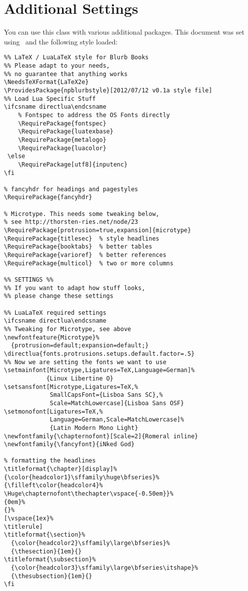 \documentclass[english,10pt,bbook=pocketbig,inner=1cm,outer=2.5cm]{npblurb}
\begin{document}
\chapter{Additional Settings}
You can use this class with various additional packages. This document was set using \LuaLaTeX\ and the following style loaded:
\begin{Verbatim}
%% LaTeX / LuaLaTeX style for Blurb Books
%% Please adapt to your needs, 
%% no guarantee that anything works
\NeedsTeXFormat{LaTeX2e}
\ProvidesPackage{npblurbstyle}[2012/07/12 v0.1a style file]
%% Load Lua Specific Stuff
\ifcsname directlua\endcsname
	% Fontspec to address the OS Fonts directly
	\RequirePackage{fontspec}
	\RequirePackage{luatexbase}
	\RequirePackage{metalogo}
	\RequirePackage{luacolor}
 \else
    \RequirePackage[utf8]{inputenc}
\fi

% fancyhdr for headings and pagestyles
\RequirePackage{fancyhdr}

% Microtype. This needs some tweaking below, 
% see http://thorsten-ries.net/node/23
\RequirePackage[protrusion=true,expansion]{microtype}
\RequirePackage{titlesec}  % style headlines
\RequirePackage{booktabs}  % better tables
\RequirePackage{varioref}  % better references
\RequirePackage{multicol}  % two or more columns

%% SETTINGS %%
%% If you want to adapt how stuff looks, 
%% please change these settings

%% LuaLaTeX required settings
\ifcsname directlua\endcsname
%% Tweaking for Microtype, see above
\newfontfeature{Microtype}%
  {protrusion=default;expansion=default;}
\directlua{fonts.protrusions.setups.default.factor=.5}
%% Now we are setting the fonts we want to use
\setmainfont[Microtype,Ligatures=TeX,Language=German]%
            {Linux Libertine O}
\setsansfont[Microtype,Ligatures=TeX,%
             SmallCapsFont={Lisboa Sans SC},%
             Scale=MatchLowercase]{Lisboa Sans OSF}
\setmonofont[Ligatures=TeX,%
             Language=German,Scale=MatchLowercase]%
             {Latin Modern Mono Light}
\newfontfamily{\chapternofont}[Scale=2]{Romeral inline}
\newfontfamily{\fancyfont}{iNked God}

% formatting the headlines
\titleformat{\chapter}[display]%
{\color{headcolor1}\sffamily\huge\bfseries}%
{\filleft\color{headcolor4}%
\Huge\chapternofont\thechapter\vspace{-0.50em}}%
{0em}%
{}%
[\vspace{1ex}%
\titlerule]
\titleformat{\section}%
  {\color{headcolor2}\sffamily\large\bfseries}%
  {\thesection}{1em}{}
\titleformat{\subsection}%
  {\color{headcolor3}\sffamily\large\bfseries\itshape}%
  {\thesubsection}{1em}{}
\fi


\end{Verbatim}
\end{document}
